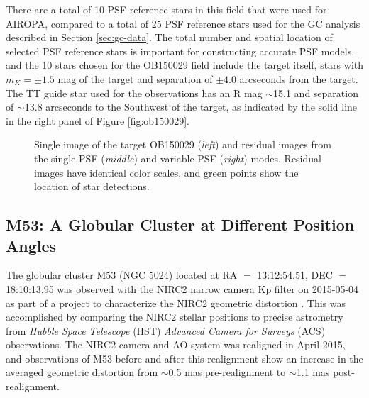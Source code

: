 \documentclass[]{spie}  %
\begin{document}
\indent There are a total of 10 PSF reference stars in this field that were used for AIROPA, compared to a total of 25 PSF reference stars used for the GC analysis described in Section \ref{sec:gc-data}. The total number and spatial location of selected PSF reference stars is important for constructing accurate PSF models, and the 10 stars chosen for the OB150029 field include the target itself, stars with $m_K = \pm 1.5$ mag of the target and separation of $\pm4.0$ arcseconds from the target. The TT guide star used for the observations has an R mag ${\sim}$15.1 and separation of ${\sim}$13.8 arcseconds to the Southwest of the target, as indicated by the solid line in the right panel of Figure \ref{fig:ob150029}.

\begin{figure}[!h]
 \caption{\footnotesize Single image of the target OB150029 (\textit{left}) and residual images from the single-PSF (\textit{middle}) and variable-PSF (\textit{right}) modes. Residual images have identical color scales, and green points show the location of star detections.} \label{fig:ob150029-targ-res}
\end{figure}


\subsection{M53: A Globular Cluster at Different Position Angles} \label{sec:m53-data}
The globular cluster M53 (NGC 5024) located at RA $=$ 13:12:54.51, DEC $=$ 18:10:13.95 was observed with the NIRC2 narrow camera Kp filter on 2015-05-04 as part of a project to characterize the NIRC2 geometric distortion \cite{service:2016a}. This was accomplished by comparing the NIRC2 stellar positions to precise astrometry from \textit{Hubble Space Telescope} (HST) \textit{Advanced Camera for Surveys} (ACS) observations. The NIRC2 camera and AO system was realigned in April 2015, and observations of M53 before and after this realignment show an increase in the averaged geometric distortion from $\sim$0.5 mas pre-realignment to $\sim$1.1 mas post-realignment.
\end{document}

